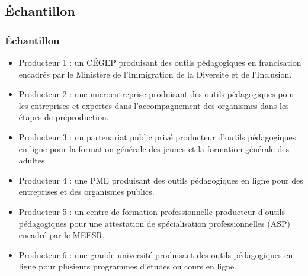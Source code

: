                        		 \subsection{Échantillon} 
					\begin{frame}[allowframebreaks]
						\frametitle{Échantillon}
                        
                        			\begin{itemize} 
                       				\item Producteur 1 : un CÉGEP produisant des outils pédagogiques en francisation encadrés par le Ministère de l’Immigration de la Diversité et de l'Inclusion.
                       				\item Producteur 2 : une microentreprise produisant des outils pédagogiques pour les entreprises et expertes dans l’accompagnement des organismes dans les étapes de préproduction.
							\item Producteur 3 : un partenariat public privé producteur d’outils pédagogiques en ligne pour la formation générale des jeunes et la formation générale des adultes.
							\item Producteur 4 : une PME produisant des outils pédagogiques en ligne pour des entreprises et des organismes publics.
							\item Producteur 5 : un centre de formation professionnelle producteur d’outils pédagogiques pour une attestation de spécialisation professionnelles (ASP) encadré par le MEESR.
							\item Producteur 6 : une grande université produisant des outils pédagogiques en ligne pour plusieurs programmes d’études ou cours en ligne.

                       		 \end{itemize}
                       		           
                \end{frame}
                       		 
